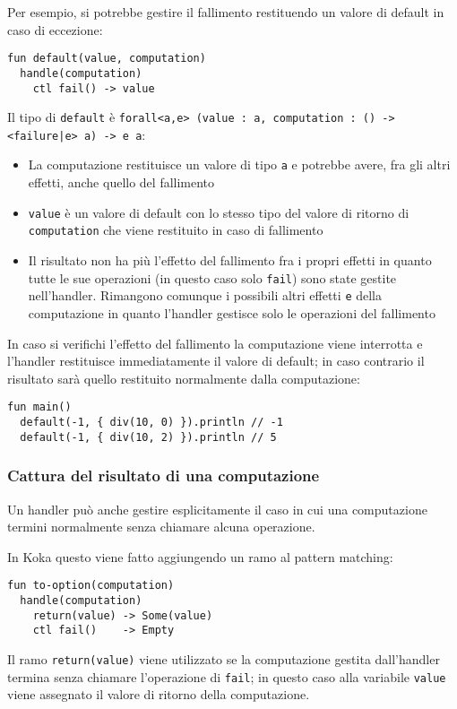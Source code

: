 Per esempio, si potrebbe gestire il fallimento restituendo un valore di default in caso di eccezione:
\begin{lstlisting}[language=koka]
fun default(value, computation)
  handle(computation)
    ctl fail() -> value
\end{lstlisting}
Il tipo di \lstinline{default} è \lstinline{forall<a,e> (value : a, computation : () -> <failure|e> a) -> e a}:
\begin{itemize}
  \item La computazione restituisce un valore di tipo \lstinline{a} e potrebbe avere, fra gli altri effetti, anche quello del fallimento
  \item \lstinline{value} è un valore di default con lo stesso tipo del valore di ritorno di \lstinline{computation} che viene restituito in caso di fallimento
  \item Il risultato non ha più l'effetto del fallimento fra i propri effetti in quanto tutte le sue operazioni (in questo caso solo \lstinline{fail}) sono state gestite nell'handler. Rimangono comunque i possibili altri effetti \lstinline{e} della computazione in quanto l'handler gestisce solo le operazioni del fallimento
\end{itemize}

In caso si verifichi l'effetto del fallimento la computazione viene interrotta e l'handler restituisce immediatamente il valore di default; in caso contrario il risultato sarà quello restituito normalmente dalla computazione:
\begin{lstlisting}[language=koka]
fun main()
  default(-1, { div(10, 0) }).println // -1
  default(-1, { div(10, 2) }).println // 5
\end{lstlisting}

\subsubsection{Cattura del risultato di una computazione}
Un handler può anche gestire esplicitamente il caso in cui una computazione termini normalmente senza chiamare alcuna operazione.

In Koka questo viene fatto aggiungendo un ramo al pattern matching:
\begin{lstlisting}[language=koka]
fun to-option(computation)
  handle(computation)
    return(value) -> Some(value)
    ctl fail()    -> Empty
\end{lstlisting}
Il ramo \lstinline{return(value)} viene utilizzato se la computazione gestita dall'handler termina senza chiamare l'operazione di \lstinline{fail}; in questo caso alla variabile \lstinline{value} viene assegnato il valore di ritorno della computazione.

